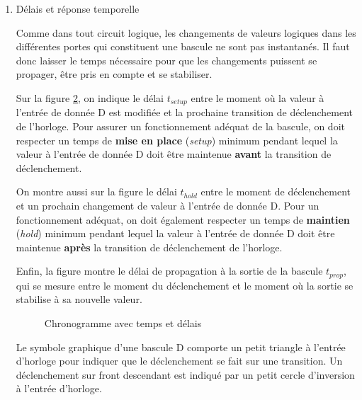 \documentclass[letter, oneside]{book}
\begin{document}
\begin{enumerate}
La figure \ref{fig:orgc265302} présente un chronogramme qui montre la bascule
qui passe de l'état 0 à l'état 1 et retourne, au cycle suivant, à
l'état 0.

\begin{figure}[htbp]
\centering

\caption{\label{fig:orgc265302}Chronogramme pour une bascule D}
\end{figure}

\item Délais et réponse temporelle
\label{sec:orga4a3e6c}

Comme dans tout circuit logique, les changements de valeurs logiques
dans les différentes portes qui constituent une bascule ne sont pas
instantanés. Il faut donc laisser le temps nécessaire pour que les
changements puissent se propager, être pris en compte et se stabiliser.

Sur la figure \ref{fig:org7bc9865}, on indique le délai \(t_{setup}\) entre le
moment où la valeur à l'entrée de donnée D est modifiée et la
prochaine transition de déclenchement de l'horloge. Pour assurer un
fonctionnement adéquat de la bascule, on doit respecter un temps de
\textbf{mise en place} (\emph{setup}) minimum pendant lequel la valeur à l'entrée
de donnée D doit être maintenue \textbf{avant} la transition de
déclenchement.

On montre aussi sur la figure le délai \(t_{hold}\) entre le moment de
déclenchement et un prochain changement de valeur à l'entrée de
donnée D. Pour un fonctionnement adéquat, on doit également respecter
un temps de \textbf{maintien} (\emph{hold}) minimum pendant lequel la valeur à
l'entrée de donnée D doit être maintenue \textbf{après} la transition de
déclenchement de l'horloge.

Enfin, la figure montre le délai de propagation à la sortie de la
bascule \(t_{prop}\), qui se mesure entre le moment du déclenchement et
le moment où la sortie se stabilise à sa nouvelle valeur.

\begin{figure}[htbp]
\centering

\caption{\label{fig:org7bc9865}Chronogramme avec temps et délais}
\end{figure}

Le symbole graphique d'une bascule D comporte un petit triangle à
l'entrée d'horloge pour indiquer que le déclenchement se fait sur une
transition. Un déclenchement sur front descendant est indiqué par un
petit cercle d'inversion à l'entrée d'horloge.


\end{enumerate}
\end{document}
